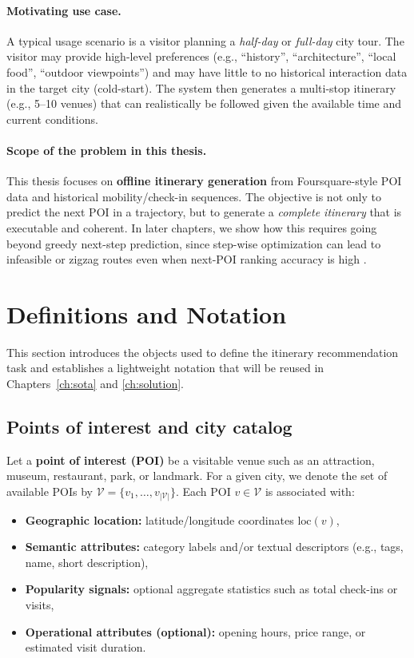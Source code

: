 \paragraph{Motivating use case.}
A typical usage scenario is a visitor planning a \emph{half-day} or \emph{full-day} city tour. The visitor may provide high-level preferences (e.g., ``history'', ``architecture'', ``local food'', ``outdoor viewpoints'') and may have little to no historical interaction data in the target city (cold-start). The system then generates a multi-stop itinerary (e.g., 5--10 venues) that can realistically be followed given the available time and current conditions.

\paragraph{Scope of the problem in this thesis.}
This thesis focuses on \textbf{offline itinerary generation} from Foursquare-style POI data and historical mobility/check-in sequences. The objective is not only to predict the next POI in a trajectory, but to generate a \emph{complete itinerary} that is executable and coherent. In later chapters, we show how this requires going beyond greedy next-step prediction, since step-wise optimization can lead to infeasible or zigzag routes even when next-POI ranking accuracy is high \citep{wu2025tlmr}.


\section{Definitions and Notation}
\label{sec:prob-defs}

This section introduces the objects used to define the itinerary recommendation task and establishes a lightweight notation that will be reused in Chapters~\ref{ch:sota} and \ref{ch:solution}.

\subsection{Points of interest and city catalog}
Let a \textbf{point of interest (POI)} be a visitable venue such as an attraction, museum, restaurant, park, or landmark. For a given city, we denote the set of available POIs by $\mathcal{V}=\{v_1,\dots,v_{|\mathcal{V}|}\}$. Each POI $v \in \mathcal{V}$ is associated with:
\begin{itemize}[leftmargin=*]
    \item \textbf{Geographic location:} latitude/longitude coordinates $\mathrm{loc}(v)$,
    \item \textbf{Semantic attributes:} category labels and/or textual descriptors (e.g., tags, name, short description),
    \item \textbf{Popularity signals:} optional aggregate statistics such as total check-ins or visits,
    \item \textbf{Operational attributes (optional):} opening hours, price range, or estimated visit duration.
\end{itemize}

